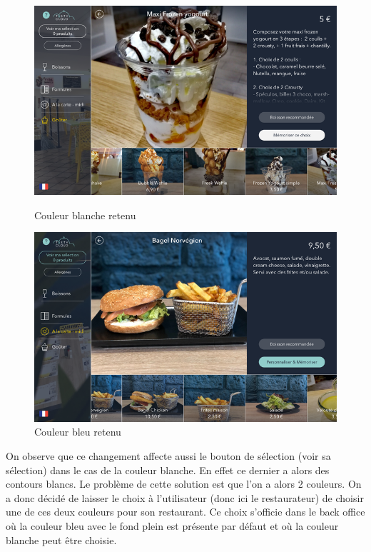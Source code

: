 \begin{figure}[!htb]
  \centering
  \begin{minipage}[b]{0.45\textwidth}
    \includegraphics[width=\textwidth]{images/couleur_bouton2.png}
    \caption{Couleur blanche retenu}
  \end{minipage}
  \hfill
  \begin{minipage}[b]{0.45\textwidth}
    \includegraphics[width=\textwidth]{images/couleur_bouton3.png}
    \caption{Couleur bleu retenu}
  \end{minipage}
\end{figure}

On observe que ce changement affecte aussi le bouton de sélection (voir sa sélection) dans le cas de la couleur blanche. En effet ce dernier a alors des contours blancs. Le problème de cette solution est que l'on a alors 2 couleurs. On a donc décidé de laisser le choix à l'utilisateur (donc ici le restaurateur) de choisir une de ces deux couleurs pour son restaurant. Ce choix s'officie dans le back office où la couleur bleu avec le fond plein est présente par défaut et où la couleur blanche peut être choisie.

